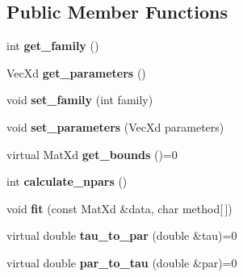 \subsection*{Public Member Functions}
\begin{DoxyCompactItemize}
\item 
\hypertarget{class_par_bicop_af6ebd560cfbe3a92ca4274667f5067cc}{int {\bfseries get\+\_\+family} ()}\label{class_par_bicop_af6ebd560cfbe3a92ca4274667f5067cc}

\item 
\hypertarget{class_par_bicop_aed38bbe93e9b18caf42298feae597836}{Vec\+Xd {\bfseries get\+\_\+parameters} ()}\label{class_par_bicop_aed38bbe93e9b18caf42298feae597836}

\item 
\hypertarget{class_par_bicop_acf9c95ac1fc3365e40ee8f7494c5143b}{void {\bfseries set\+\_\+family} (int family)}\label{class_par_bicop_acf9c95ac1fc3365e40ee8f7494c5143b}

\item 
\hypertarget{class_par_bicop_a72c02f5391a68c6f9daaacbc7f2af66b}{void {\bfseries set\+\_\+parameters} (Vec\+Xd parameters)}\label{class_par_bicop_a72c02f5391a68c6f9daaacbc7f2af66b}

\item 
\hypertarget{class_par_bicop_ae83399bd0c5529174709b219e4e8ba01}{virtual Mat\+Xd {\bfseries get\+\_\+bounds} ()=0}\label{class_par_bicop_ae83399bd0c5529174709b219e4e8ba01}

\item 
\hypertarget{class_par_bicop_ade5b88a9bf7f9e6b9d75228a8db146ee}{int {\bfseries calculate\+\_\+npars} ()}\label{class_par_bicop_ade5b88a9bf7f9e6b9d75228a8db146ee}

\item 
\hypertarget{class_par_bicop_adabaee5d0bcf085f81ec783464d0b449}{void {\bfseries fit} (const Mat\+Xd \&data, char method\mbox{[}$\,$\mbox{]})}\label{class_par_bicop_adabaee5d0bcf085f81ec783464d0b449}

\item 
\hypertarget{class_par_bicop_a9f667a71aee3a7493e1d82d2fcf1e06f}{virtual double {\bfseries tau\+\_\+to\+\_\+par} (double \&tau)=0}\label{class_par_bicop_a9f667a71aee3a7493e1d82d2fcf1e06f}

\item 
\hypertarget{class_par_bicop_ab994020b3c87e62710453f7a4a229814}{virtual double {\bfseries par\+\_\+to\+\_\+tau} (double \&par)=0}\label{class_par_bicop_ab994020b3c87e62710453f7a4a229814}

\end{DoxyCompactItemize}
